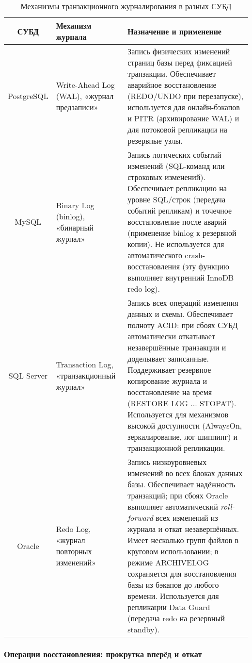  \begin{table}[H]
    \centering
    \begin{tabular}{|c|p{4.25cm}|p{7.75cm}|}
        \hline
        \textbf{СУБД} & \textbf{Механизм журнала} & \textbf{Назначение и применение} \\
        \hline
        PostgreSQL & Write-Ahead Log (WAL), «журнал предзаписи» & Запись физических изменений страниц базы перед фиксацией транзакции. Обеспечивает аварийное восстановление (REDO/UNDO при перезапуске), используется для онлайн-бэкапов и PITR (архивирование WAL) и для потоковой репликации на резервные узлы. \autocite{PostgreSQLdocc28} \\
        \hline
        MySQL & Binary Log (binlog), «бинарный журнал» & Запись логических событий изменений (SQL-команд или строковых изменений). Обеспечивает репликацию на уровне SQL/строк (передача событий репликам) и точечное восстановление после аварий (применение binlog к резервной копии). Не используется для автоматического crash-восстановления (эту функцию выполняет внутренний InnoDB redo log). \autocite{Mysqldoc7} \\
        \hline
        SQL Server & Transaction Log, «транзакционный журнал» & Запись всех операций изменения данных и схемы. Обеспечивает полноту ACID: при сбоях СУБД автоматически откатывает незавершённые транзакции и доделывает записанные. Поддерживает резервное копирование журнала и восстановление на время (RESTORE LOG ... STOPAT). Используется для механизмов высокой доступности (AlwaysOn, зеркалирование, лог-шиппинг) и транзакционной репликации. \autocite{MicrosoftLearnSQLserverTransLog} \\
        \hline
        Oracle & Redo Log, «журнал повторных изменений» & Запись низкоуровневых изменений во всех блоках данных базы. Обеспечивает надёжность транзакций; при сбоях Oracle выполняет автоматический \textit{roll-forward} всех изменений из журнала и откат незавершённых. Имеет несколько групп файлов в круговом использовании; в режиме ARCHIVELOG сохраняется для восстановления базы из бэкапов до любого времени. Используется для репликации Data Guard (передача redo на резервный standby). \autocite{OracleRedoLog} \\
        \hline
    \end{tabular}
    \caption{Механизмы транзакционного журналирования в разных СУБД}
    \label{tab:txn_logging_mechanisms}
\end{table}

\subsubsection{Операции восстановления: прокрутка вперёд и откат} 
 
